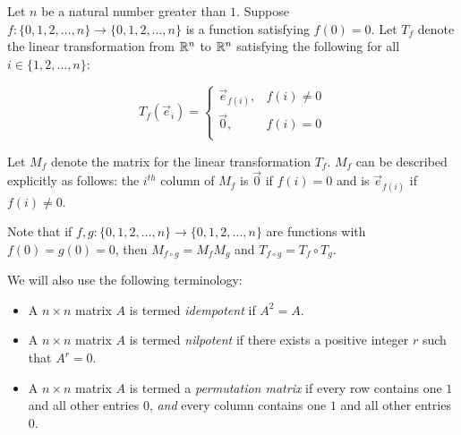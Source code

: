\documentclass[10pt]{amsart}
\begin{document}
\vspace{0.2in}

Let $n$ be a natural number greater than $1$. Suppose $f: \{
0,1,2,\dots,n\} \to \{ 0,1,2,\dots,n\}$ is a function satisfying $f(0)
= 0$. Let $T_f$ denote the linear transformation from $\mathbb{R}^n$ to $\mathbb{R}^n$
satisfying the following for all $i \in \{ 1,2,\dots,n\}$:

$$T_f(\vec{e}_i) = \left \lbrace \begin{array}{rl} \vec{e}_{f(i)}, & f(i) \ne 0\\ \vec{0}, & f(i) = 0\\\end{array}\right.$$

Let $M_f$ denote the matrix for the linear transformation $T_f$. $M_f$
can be described explicitly as follows: the $i^{th}$ column of $M_f$
is $\vec{0}$ if $f(i) = 0$ and is $\vec{e}_{f(i)}$ if $f(i) \ne 0$.

Note that if $f,g: \{ 0,1,2,\dots,n \} \to \{ 0,1,2,\dots,n\}$ are
functions with $f(0)= g(0) = 0$, then $M_{f \circ g} = M_fM_g$ and
$T_{f \circ g} = T_f \circ T_g$.

We will also use the following terminology:

\begin{itemize}
\item A $n \times n$ matrix $A$ is termed {\em idempotent} if $A^2 = A$.
\item A $n \times n$ matrix $A$ is termed {\em nilpotent} if there
  exists a positive integer $r$ such that $A^r = 0$.
\item A $n \times n$ matrix $A$ is termed a {\em permutation matrix}
  if every row contains one $1$ and all other entries $0$, {\em and}
  every column contains one $1$ and all other entries $0$.
\end{itemize}
\end{document}
